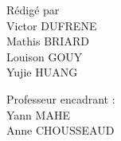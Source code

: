 {

\begin{center}
	\begin{minipage}{0.4\textwidth}
		\begin{flushleft} \large
        	\noindent Rédigé par\\ %
			Victor DUFRENE \\
			Mathis BRIARD\\
			Louison GOUY\\
			Yujie HUANG
		\end{flushleft}
	\end{minipage}
	\begin{minipage}{0.4\textwidth}
		\begin{flushright}\large
			Professeur encadrant : \\Yann MAHE\\ Anne CHOUSSEAUD\\
						
		\end{flushright}
	\end{minipage}
\end{center}
}